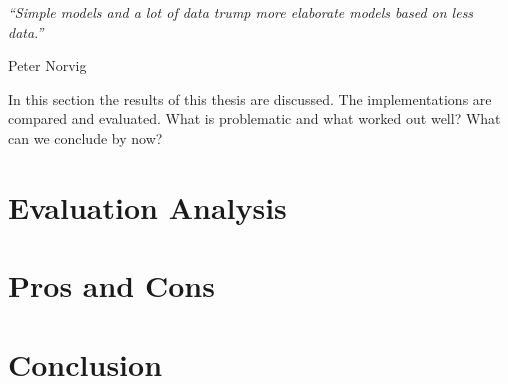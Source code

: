 \epigraph{\emph{
  ``Simple models and a lot of data trump more elaborate models based on less data.''
}}{ Peter Norvig }

In this section the results of this thesis are discussed. The implementations are compared and evaluated. What is problematic and what worked out well? What can we conclude by now?

\section{Evaluation Analysis}
\section{Pros and Cons}
\section{Conclusion}